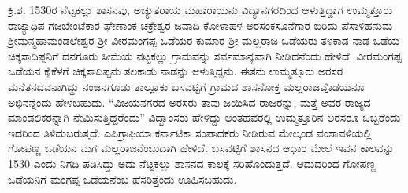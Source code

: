ಕ್ರಿ.ಶ. 1530ರ ನೆಟ್ಟಕಲ್ಲು ಶಾಸನವು, ಅಚ್ಯುತರಾಯ ಮಹಾರಾಯನು ವಿದ್ಯಾನಗರದಿಂದ ಆಳುತ್ತಿದ್ದಾಗ ಉಮ್ಮತ್ತೂರು ರಾಜ್ಯಾಧಿಪ ಗಜಬೇಂಟೆಕಾರ ಘೇಣಾಂಕ ಚಕ್ರೇಶ್ವರ ಜವಾದಿ ಕೋಳಾಹಳ ಅರಸಂಕಸೂನೆಗಾರ ಬಿರಿದು ಪೆಸಾಳಿಹನುಮ ಶ‍್ರೀಮನ್ಮಹಾಮಂಡಲೇಶ್ವರ ಶ‍್ರೀ ವೀರಮಂಗಪ್ಪ ಒಡೆಯರ ಕುಮಾರ ಶ‍್ರೀ ಮಲ್ಲರಾಜ ಒಡೆಯರು ತಳಕಾಡ ನಾಡ ಒಡೆಯ ಚಿಕ್ಕಸಾದಿಪ್ಪನಿಗೆ ದನಗೂರು ಸೀಮೆಯ ನಟ್ಟಕಲ್ಲು ಗ್ರಾಮವನ್ನು ಸರ್ವಮಾನ್ಯವಾಗಿ ನೀಡಿದನೆಂದು ಹೇಳಿದೆ. ವೀರಮಂಗಪ್ಪ ಒಡೆಯನ\textbf{ } ಕೈಕೆಳಗೆ ಚಿಕ್ಕಸಾದಿಪ್ಪನು ತಲಕಾಡು ನಾಡನ್ನು ಆಳುತ್ತಿದ್ದನು. ಈತನು ಉಮ್ಮತ್ತೂರು ಅರಸರ ಮನೆತನದವನಾಗಿದ್ದು ನಂಜನಗೂಡು ತಾಲ್ಲೂಕು ಬಸವಟ್ಟಿಗೆ ಗ್ರಾಮದ ಶಾಸನೋಕ್ತ ಮಲ್ಲರಾಜವೊಡಯನೂ ಅಭಿನನ್ನೆಂದು ಹೇಳಬಹುದು. “ವಿಜಯನಗರದ ಅರಸರು ತಾವು ಜಯಿಸಿದ ರಾಜರನ್ನು, ಮತ್ತೆ ಅವರ ರಾಜ್ಯದ ಮಾಂಡಲಿಕರನ್ನಾಗಿ ನೇಮಿಸುತ್ತಿದ್ದರೆಂದು” ವಿದ್ವಾಂಸರು ಹೇಳಿದ್ದು ಅಂತಹವರಲ್ಲಿ ಉಮ್ಮತ್ತೂರಿನ ಅರಸರೂ ಒಬ್ಬರೆಂದು ಇದರಿಂದ ತಿಳಿದು\-ಬರುತ್ತದೆ.\textbf{ }ಎಪಿಗ್ರಾಫಿಯಾ ಕರ್ನಾಟಿಕಾ ಸಂಪಾದಕರು ನೀಡಿರುವ ಮೇಲ್ಕಂಡ ವಂಶಾವಳಿಯಲ್ಲಿ ಗೋಪಣ್ಣ ಒಡೆಯನ ಮಗ ಮಲ್ಲರಾಜ\-ನೆಂಬುದಾಗಿ ಹೇಳಿದೆ. ಬಸವಟ್ಟಿಗೆ ಶಾಸನದ ಆಧಾರ ಮೇಲೆ ಇವನ ಕಾಲವನ್ನು 1530 ಎಂದು ನಿಗದಿ ಪಡಿಸಿದ್ದು ಅದು ನೆಟ್ಟಕಲ್ಲು ಶಾಸನದ ಕಾಲಕ್ಕೆ ಸರಿಹೊಂದುತ್ತದೆ. ಆದುದರಿಂದ ಗೋಪಣ್ಣ ಒಡೆಯನಿಗೆ ಮಂಗಪ್ಪ ಒಡೆಯನೆಂಬ ಹೆಸರಿತ್ತೆಂದು ಊಹಿಸಬಹುದು. 


